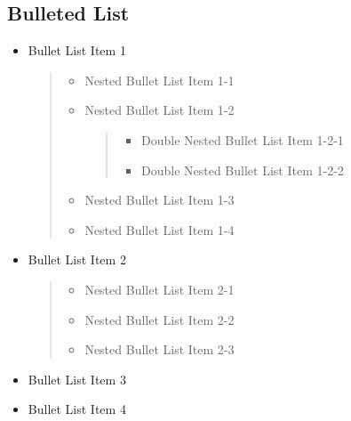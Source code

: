 \documentclass{book}
\begin{document}
\subsection{Bulleted List%
  \label{bulleted-list}%
}
%
\begin{itemize}

\item Bullet List Item 1
%
\begin{quote}
%
\begin{itemize}

\item Nested Bullet List Item 1-1

\item Nested Bullet List Item 1-2
%
\begin{quote}
%
\begin{itemize}

\item Double Nested Bullet List Item 1-2-1

\item Double Nested Bullet List Item 1-2-2

\end{itemize}

\end{quote}

\item Nested Bullet List Item 1-3

\item Nested Bullet List Item 1-4

\end{itemize}

\end{quote}

\item Bullet List Item 2
%
\begin{quote}
%
\begin{itemize}

\item Nested Bullet List Item 2-1

\item Nested Bullet List Item 2-2

\item Nested Bullet List Item 2-3

\end{itemize}

\end{quote}

\item Bullet List Item 3

\item Bullet List Item 4

\end{itemize}
\end{document}
